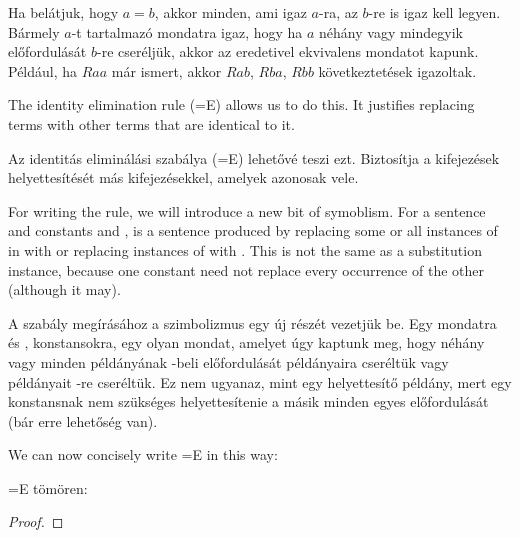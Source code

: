 Ha belátjuk, hogy $a=b$, akkor minden, ami igaz $a$-ra, az $b$-re is igaz kell legyen. Bármely $a$-t tartalmazó mondatra igaz, hogy ha $a$ néhány vagy mindegyik előfordulását $b$-re cseréljük, akkor az eredetivel ekvivalens mondatot kapunk. Például, ha $Raa$ már ismert, akkor $Rab$, $Rba$, $Rbb$ következtetések igazoltak.


The identity elimination rule ({=}E) allows us to do this. It justifies replacing terms with other terms that are identical to it.

Az identitás eliminálási szabálya ({=}E) lehetővé teszi ezt. Biztosítja a kifejezések helyettesítését más kifejezésekkel, amelyek azonosak vele.

For writing the rule, we will introduce a new bit of symoblism. For a sentence  and constants  and ,  is a sentence produced by replacing some or all instances of  in  with  or replacing instances of  with . This is not the same as a substitution instance, because one constant need not replace every occurrence of the other (although it may).

A szabály megírásához a szimbolizmus egy új részét vezetjük be. Egy  mondatra és ,  konstansokra,  egy olyan mondat, amelyet úgy kaptunk meg, hogy  néhány vagy minden példányának -beli előfordulását  példányaira cseréltük vagy  példányait -re cseréltük. Ez nem ugyanaz, mint egy helyettesítő példány, mert egy konstansnak nem szükséges helyettesítenie a másik minden egyes előfordulását (bár erre lehetőség van).

We can now concisely write {=}E in this way:

{=}E tömören:

\begin{proof}
	 
\end{proof}
\nopagebreak





